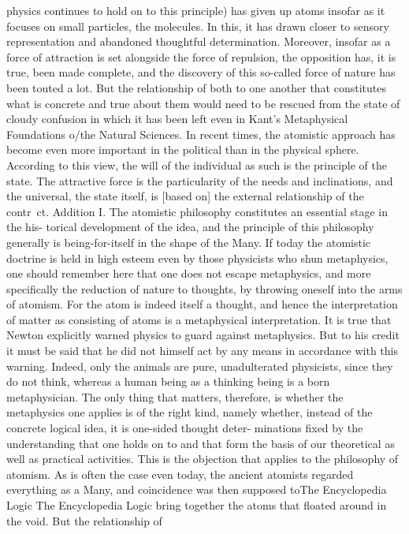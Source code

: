physics continues to hold on to this principle) has given up atoms
insofar as it focuses on small particles, the molecules. In this, it has
drawn closer to sensory representation and abandoned thoughtful
determination. Moreover, insofar as a force of attraction is set
alongside the force of repulsion, the opposition has, it is true, been
made complete, and the discovery of this so-called force of nature has
been touted a lot. But the relationship of both to one another that
constitutes what is concrete and true about them would need to be
rescued from the state of cloudy confusion in which it has been left
even in Kant's Metaphysical Foundations o/the Natural Sciences.
In recent times, the atomistic approach has become even more
important in the political than in the physical sphere. According to
this view, the will of the individual as such is the principle of the
state. The attractive force is the particularity of the needs and
inclinations, and the universal, the state itself, is [based on] the
external relationship of the contr~ct.
Addition I. The atomistic philosophy constitutes an essential stage in the his-
torical development of the idea, and the principle of this philosophy generally is
being-for-itself in the shape of the Many. If today the atomistic doctrine is held in
high esteem even by those physicists who shun metaphysics, one should remember
here that one does not escape metaphysics, and more specifically the reduction of
nature to thoughts, by throwing oneself into the arms of atomism. For the atom
is indeed itself a thought, and hence the interpretation of matter as consisting of
atoms is a metaphysical interpretation. It is true that Newton explicitly warned
physics to guard against metaphysics. But to his credit it must be said that he
did not himself act by any means in accordance with this warning. Indeed, only
the animals are pure, unadulterated physicists, since they do not think, whereas
a human being as a thinking being is a born metaphysician. The only thing that
matters, therefore, is whether the metaphysics one applies is of the right kind,
namely whether, instead of the concrete logical idea, it is one-sided thought deter-
minations fixed by the understanding that one holds on to and that form the
basis of our theoretical as well as practical activities. This is the objection that
applies to the philosophy of atomism. As is often the case even today, the ancient
atomists regarded everything as a Many, and coincidence was then supposed toThe Encyclopedia Logic
The Encyclopedia Logic
bring together the atoms that floated around in the void. But the relationship of
